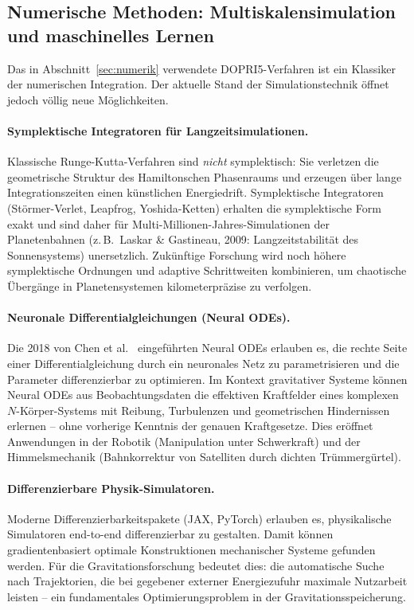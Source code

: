 ﻿\documentclass[12pt, a4paper]{report}
\theoremstyle{definition}
\theoremstyle{remark}
\begin{document}
\subsection{Numerische Methoden: Multiskalensimulation und maschinelles
               Lernen}

Das in Abschnitt~\ref{sec:numerik} verwendete DOPRI5-Verfahren ist ein
Klassiker der numerischen Integration. Der aktuelle Stand der Simulationstechnik
öffnet jedoch völlig neue Möglichkeiten.

\paragraph{Symplektische Integratoren für Langzeitsimulationen.}
Klassische Runge-Kutta-Verfahren sind \emph{nicht} symplektisch: Sie verletzen
die geometrische Struktur des Hamiltonschen Phasenraums und erzeugen über lange
Integrationszeiten einen künstlichen Energiedrift. Symplektische Integratoren
(Störmer-Verlet, Leapfrog, Yoshida-Ketten) erhalten die symplektische Form exakt
und sind daher für Multi-Millionen-Jahres-Simulationen der Planetenbahnen (z.\,B.\
Laskar \& Gastineau, 2009: Langzeitstabilität des Sonnensystems) unersetzlich.
Zukünftige Forschung wird noch höhere symplektische Ordnungen und adaptive
Schrittweiten kombinieren, um chaotische Übergänge in Planetensystemen
kilometerpräzise zu verfolgen.

\paragraph{Neuronale Differentialgleichungen (Neural ODEs).}
Die 2018 von Chen et al.~\cite{chen2018} eingeführten Neural ODEs erlauben es, die rechte Seite
einer Differentialgleichung durch ein neuronales Netz zu parametrisieren und die
Parameter differenzierbar zu optimieren. Im Kontext gravitativer Systeme können
Neural ODEs aus Beobachtungsdaten die effektiven Kraftfelder eines komplexen
$N$-Körper-Systems mit Reibung, Turbulenzen und geometrischen Hindernissen erlernen
-- ohne vorherige Kenntnis der genauen Kraftgesetze. Dies eröffnet Anwendungen in
der Robotik (Manipulation unter Schwerkraft) und der Himmelsmechanik (Bahnkorrektur
von Satelliten durch dichten Trümmergürtel).

\paragraph{Differenzierbare Physik-Simulatoren.}
Moderne Differenzierbarkeitspakete (JAX, PyTorch) erlauben es, physikalische
Simulatoren end-to-end differenzierbar zu gestalten. Damit können gradientenbasiert
optimale Konstruktionen mechanischer Systeme gefunden werden. Für die
Gravitationsforschung bedeutet dies: die automatische Suche nach Trajektorien,
die bei gegebener externer Energiezufuhr maximale Nutzarbeit leisten -- ein
fundamentales Optimierungsproblem in der Gravitationsspeicherung.
\end{document}
